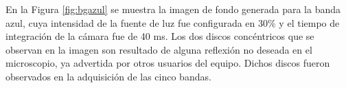 En la Figura \ref{fig:bgazul} se muestra la imagen de fondo generada para la banda azul, cuya intensidad de la fuente de luz fue configurada en 30$\%$ y el tiempo de integración de la cámara fue de 40 ms. Los dos discos concéntricos que se observan en la imagen son resultado de alguna reflexión no deseada en el microscopio, ya advertida por otros usuarios del equipo. Dichos discos fueron observados en la adquisición de las cinco bandas. 
	\begin{figure}[H]
		\begin{floatrow}

\end{floatrow}
\end{figure}
